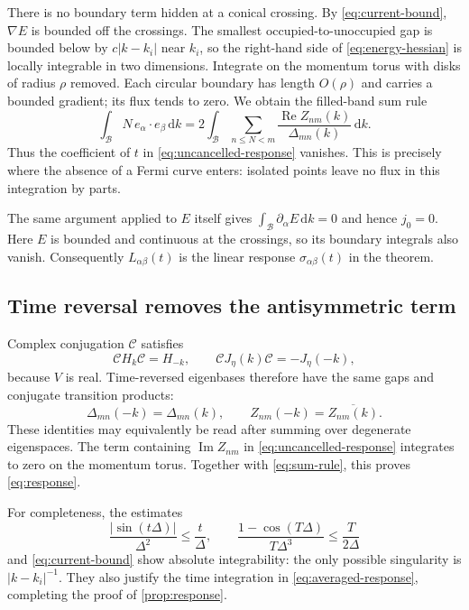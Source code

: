 \documentclass[11pt,a4paper]{article}
\newcommand{\BZ}{\mathcal B}
\newcommand{\dd}{\,\mathrm d}
\DeclareMathOperator{\Rea}{Re}
\DeclareMathOperator{\Ima}{Im}
\theoremstyle{remark}
\numberwithin{equation}{section}
\begin{document}
There is no boundary term hidden at a conical crossing.
By \eqref{eq:current-bound}, $\nabla E$ is bounded off the crossings.
The smallest occupied-to-unoccupied gap is bounded below by
$c|k-k_i|$ near $k_i$, so the right-hand side of
\eqref{eq:energy-hessian} is locally integrable in two dimensions.
Integrate on the momentum torus with disks of radius $\rho$ removed.
Each circular boundary has length $O(\rho)$ and carries a bounded
gradient; its flux tends to zero. We obtain the filled-band sum rule
\begin{equation}
 \int_\BZ N\,e_\alpha\cdot e_\beta\dd k
 =2\int_\BZ\sum_{n\leq N<m}
                  \frac{\Rea Z_{nm}(k)}{\Delta_{mn}(k)}\dd k.
 \label{eq:sum-rule}
\end{equation}
Thus the coefficient of $t$ in \eqref{eq:uncancelled-response} vanishes.
This is precisely where the absence of a Fermi curve enters: isolated
points leave no flux in this integration by parts.

The same argument applied to $E$ itself gives
$\int_\BZ\partial_\alpha E\dd k=0$ and hence $j_0=0$.
Here $E$ is bounded and continuous at the crossings, so its boundary
integrals also vanish. Consequently $L_{\alpha\beta}(t)$ is the
linear response $\sigma_{\alpha\beta}(t)$ in the theorem.

\subsection{Time reversal removes the antisymmetric term}

Complex conjugation $\mathcal C$ satisfies
\[
 \mathcal C H_k\mathcal C=H_{-k},\qquad
 \mathcal C J_\eta(k)\mathcal C=-J_\eta(-k),
\]
because $V$ is real. Time-reversed eigenbases therefore have the same
gaps and conjugate transition products:
\[
 \Delta_{mn}(-k)=\Delta_{mn}(k),\qquad
 Z_{nm}(-k)=\overline{Z_{nm}(k)}.
\]
These identities may equivalently be read after summing over degenerate
eigenspaces. The term containing $\Ima Z_{nm}$ in
\eqref{eq:uncancelled-response} integrates to zero on the momentum torus.
Together with \eqref{eq:sum-rule}, this proves \eqref{eq:response}.

For completeness, the estimates
\[
 \frac{|\sin(t\Delta)|}{\Delta^2}\leq\frac{t}{\Delta},
 \qquad
 \frac{1-\cos(T\Delta)}{T\Delta^3}\leq\frac{T}{2\Delta}
\]
and \eqref{eq:current-bound} show absolute integrability: the only
possible singularity is $|k-k_i|^{-1}$. They also justify the time
integration in \eqref{eq:averaged-response}, completing the proof of
\cref{prop:response}.
\end{document}
